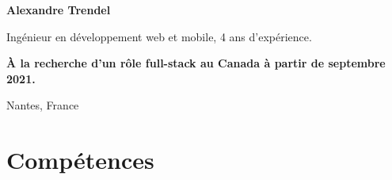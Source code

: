 \documentclass{cv}
\begin{document}
\pagestyle{empty}

\noindent\textbf{\color{solviolet} \LARGE Alexandre Trendel}\medskip

\noindent\begin{minipage}[t]{0.5\textwidth}
	Ingénieur en développement web et mobile, 4 ans d'expérience. \smallskip
	
	\textbf{À la recherche d'un rôle full-stack au Canada à partir de septembre 2021.}	
\end{minipage}\hfill%
\begin{minipage}[t]{0.3\textwidth}
	
	 Nantes, France
	\newline{} %
	\newline{} \href{mailto:%
	}{\link{%
	}}%
	\newline{} \href{https://github.com/xou816}{} 
	
\end{minipage}

\bigskip\noindent{\color{solviolet}\rule{3cm}{1.5pt}}

\section{Compétences}
\end{document}
